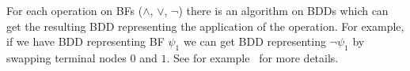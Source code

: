 \documentclass[
  digital, %
  twoside, %
  table,   %
  nolof,     %
  nolot,     %
]{fithesis3}
\theoremstyle{definition}
\newtheorem{example}{Example}
\theoremstyle{remark}
\begin{document}





For each operation on BFs (${\land}$, ${\lor}$, ${\neg}$) there is an algorithm on BDDs which can get the resulting BDD representing the application of the operation. For example, if we have BDD representing BF $\psi_1$ we can get BDD representing $\neg \psi_1$ by swapping terminal nodes $0$ and $1$. See for example~\cite{BDDdetails} for more details. %


\end{document}
